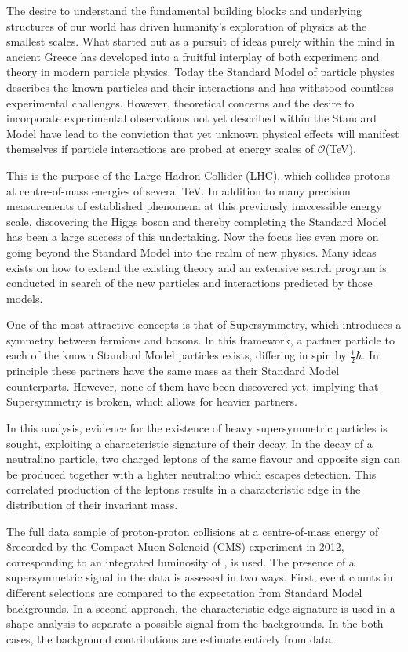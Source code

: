 The desire to understand the fundamental building blocks and underlying structures of our world has driven humanity's exploration of physics at the smallest scales. What started out as a pursuit of ideas purely within the mind in ancient Greece has developed into a fruitful interplay of both experiment and theory in modern particle physics. Today the Standard Model of particle physics describes the known particles and their interactions and has withstood countless experimental challenges. However, theoretical concerns and the desire to incorporate experimental observations not yet described within the Standard Model have lead to the conviction that yet unknown physical effects will manifest themselves if particle interactions are probed at energy scales of $\mathcal{O}$(TeV).

This is the purpose of the Large Hadron Collider (LHC), which collides protons at centre-of-mass energies of several TeV. In addition to many precision measurements of established phenomena at this previously inaccessible energy scale, discovering the Higgs boson and thereby completing the Standard Model has been a large success of this undertaking. Now the focus lies even more on going beyond the Standard Model into the realm of new physics. Many ideas exists on how to extend the existing theory and an extensive search program is conducted in search of the new particles and interactions predicted by those models. 

One of the most attractive concepts is that of Supersymmetry, which introduces a symmetry between fermions and bosons. In this framework, a partner particle to each of the known Standard Model particles exists, differing in spin by $\frac{1}{2}\hbar$. In principle these partners have the same mass as their Standard Model counterparts. However, none of them have been discovered yet, implying that Supersymmetry is broken, which allows for heavier partners.

In this analysis, evidence for the existence of heavy supersymmetric particles is sought, exploiting a characteristic signature of their decay. In the decay of a neutralino particle, two charged leptons of the same flavour and opposite sign can be produced together with a lighter neutralino which escapes detection. This correlated production of the leptons results in a characteristic edge in the distribution of their invariant mass.

The full data sample of proton-proton collisions at a centre-of-mass energy of 8\TeV recorded by the Compact Muon Solenoid (CMS) experiment in 2012, corresponding to an integrated luminosity of \lumi, is used. The presence of a supersymmetric signal in the data is assessed in two ways. First, event counts in different selections are compared to the expectation from Standard Model backgrounds. In a second approach, the characteristic edge signature is used in a shape analysis to separate a possible signal from the backgrounds. In the both cases, the background contributions are estimate entirely from data. 

